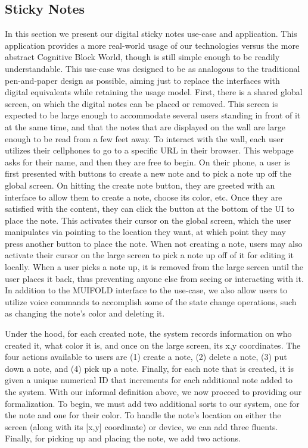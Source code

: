 \subsection{Sticky Notes}

In this section we present our digital sticky notes use-case and application. This
application provides a more real-world usage of our technologies versus the more
abstract Cognitive Block World, though is still simple enough to be readily
understandable. This use-case was designed to be as analogous to the traditional
pen-and-paper design as possible, aiming just to replace the interfaces with digital
equivalents while retaining the usage model. First, there is a shared global screen,
on which the digital notes can be placed or removed. This screen is expected to be
large enough to
accommodate several users standing in front of it at the same time, and that the notes
that are displayed on the wall are large enough to be read from a few feet away. To
interact with the wall, each user utilizes their cellphones to go to a specific URL in
their browser. This webpage asks for their name, and then they are free to begin. On
their phone, a user is first presented with buttons to create a new note and to pick
a note up off the global screen. On hitting the create note button, they are greeted
with an interface to allow them to create a note, choose its color, etc. Once they are
satisfied with the content, they can click the button at the bottom of the UI to place
the note. This activates their cursor on the global screen, which the user manipulates
via pointing to the location they want, at which point they may press another button
to place the note. When not creating a note, users may also activate their cursor on
the large screen to pick a note up off of it for editing it locally. When a user picks
a note up, it is removed from the large screen until the user places it back, thus
preventing anyone else from seeing or interacting with it. In addition to the MUIFOLD
interface to the use-case, we also allow users to utilize voice commands to accomplish
some of the state change operations, such as changing the note's color and deleting it.

Under the hood, for each created note, the system records information on who created it,
what color it is, and once on the large screen, its x,y coordinates. The four actions
available to users are (1) create a note, (2) delete a note, (3) put down a note, and (4)
pick up a note. Finally, for each note that is created, it is given a unique numerical
ID that increments for each additional note added to the system. With our informal definition 
above, we now proceed to providing our formalization. To begin, we must add two additional
sorts to our system, one for the note and one for their color. To handle the note's location on
either the screen (along with its [x,y] coordinate) or device, we can add three fluents. Finally,
for picking up and placing the note, we add two actions.

